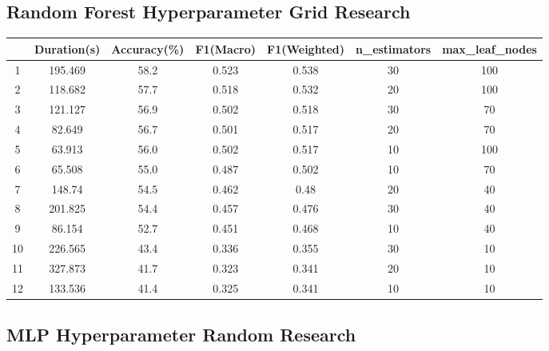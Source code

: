\subsection*{Random Forest Hyperparameter Grid Research}

\begin{table}[h]
\centering
\begin{tabular}{@{}ccccccc@{}}
\toprule
   & Duration(s) & Accuracy(\%)       & F1(Macro) & F1(Weighted) & n\_estimators & max\_leaf\_nodes \\ \midrule
1  & 195.469     & 58.2 & 0.523     & 0.538        & 30            & 100              \\
2  & 118.682     & 57.7 & 0.518     & 0.532        & 20            & 100              \\
3  & 121.127     & 56.9  & 0.502     & 0.518        & 30            & 70               \\
4  & 82.649      & 56.7 & 0.501     & 0.517        & 20            & 70               \\
5  & 63.913      & 56.0  & 0.502     & 0.517        & 10            & 100              \\
6  & 65.508      & 55.0  & 0.487     & 0.502        & 10            & 70               \\
7  & 148.74      & 54.5  & 0.462     & 0.48         & 20            & 40               \\
8  & 201.825     & 54.4 & 0.457     & 0.476        & 30            & 40               \\
9  & 86.154      & 52.7               & 0.451     & 0.468        & 10            & 40               \\
10 & 226.565     & 43.4               & 0.336     & 0.355        & 30            & 10               \\
11 & 327.873     & 41.7 & 0.323     & 0.341        & 20            & 10               \\
12 & 133.536     & 41.4               & 0.325     & 0.341        & 10            & 10               \\ \bottomrule
\end{tabular}
\end{table}

\newpage

\subsection*{MLP Hyperparameter Random Research}

